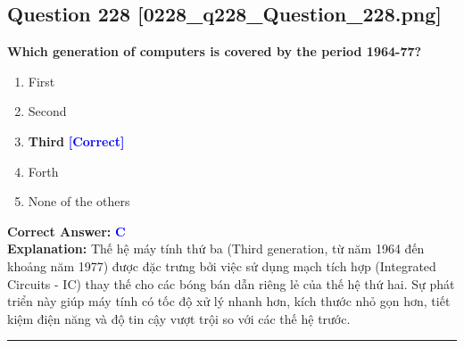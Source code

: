 \documentclass[11pt,a4paper]{article}
\begin{document}
\begin{minipage}{\textwidth}
\subsection*{Question 228 \quad \footnotesize{[0228\_q228\_Question\_228.png]}}
\noindent \textbf{Which generation of computers is covered by the period 1964-77?}

\begin{enumerate}[label=\Alph*.]
    \item First
    \item Second
    \item \textbf{Third} \hfill \textcolor{blue}{\textbf{[Correct]}}
    \item Forth
    \item None of the others
\end{enumerate}

\noindent \textbf{Correct Answer:} \textcolor{blue}{\textbf{C}} \\[2pt]
\noindent \textbf{Explanation:} Thế hệ máy tính thứ ba (Third generation, từ năm 1964 đến khoảng năm 1977) được đặc trưng bởi việc sử dụng mạch tích hợp (Integrated Circuits - IC) thay thế cho các bóng bán dẫn riêng lẻ của thế hệ thứ hai. Sự phát triển này giúp máy tính có tốc độ xử lý nhanh hơn, kích thước nhỏ gọn hơn, tiết kiệm điện năng và độ tin cậy vượt trội so với các thế hệ trước.

\par\vspace{0.3cm}
\hrule
\vspace{0.3cm}
\end{minipage}
\end{document}
